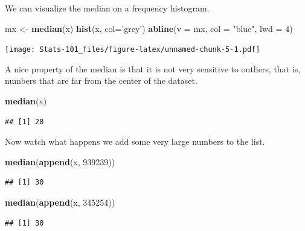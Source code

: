 \documentclass[]{book}
\newenvironment{Shaded}{\begin{snugshade}}{\end{snugshade}}
\newcommand{\DataTypeTok}[1]{\textcolor[rgb]{0.13,0.29,0.53}{#1}}
\newcommand{\DecValTok}[1]{\textcolor[rgb]{0.00,0.00,0.81}{#1}}
\newcommand{\KeywordTok}[1]{\textcolor[rgb]{0.13,0.29,0.53}{\textbf{#1}}}
\newcommand{\NormalTok}[1]{#1}
\newcommand{\StringTok}[1]{\textcolor[rgb]{0.31,0.60,0.02}{#1}}
\begin{document}
We can visualize the median on a frequency histogram.

\begin{Shaded}
\begin{Highlighting}[]
\NormalTok{mx <-}\StringTok{ }\KeywordTok{median}\NormalTok{(x)}
\KeywordTok{hist}\NormalTok{(x, }\DataTypeTok{col=}\StringTok{'grey'}\NormalTok{)}
\KeywordTok{abline}\NormalTok{(}\DataTypeTok{v =}\NormalTok{ mx, }\DataTypeTok{col =} \StringTok{"blue"}\NormalTok{, }\DataTypeTok{lwd =} \DecValTok{4}\NormalTok{)}
\end{Highlighting}
\end{Shaded}

\texttt{[image: Stats-101\_files/figure-latex/unnamed-chunk-5-1.pdf]}

A nice property of the median is that it is not very sensitive to outliers, that is, numbers that are far from the center of the dataset.

\begin{Shaded}
\begin{Highlighting}[]
\KeywordTok{median}\NormalTok{(x)}
\end{Highlighting}
\end{Shaded}

\begin{verbatim}
## [1] 28
\end{verbatim}

Now watch what happens we add some very large numbers to the list.

\begin{Shaded}
\begin{Highlighting}[]
\KeywordTok{median}\NormalTok{(}\KeywordTok{append}\NormalTok{(x, }\DecValTok{939239}\NormalTok{))}
\end{Highlighting}
\end{Shaded}

\begin{verbatim}
## [1] 30
\end{verbatim}

\begin{Shaded}
\begin{Highlighting}[]
\KeywordTok{median}\NormalTok{(}\KeywordTok{append}\NormalTok{(x, }\DecValTok{345254}\NormalTok{))}
\end{Highlighting}
\end{Shaded}

\begin{verbatim}
## [1] 30
\end{verbatim}
\end{document}
